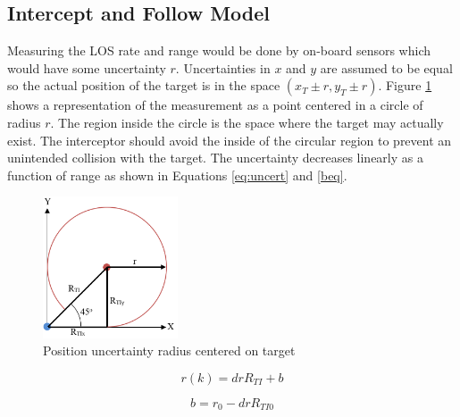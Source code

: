\documentclass[conference]{IEEEtran}
\begin{document}
%		


\subsection{Intercept and Follow Model}
Measuring the LOS rate and range would be done by on-board sensors which would have some uncertainty $r$. Uncertainties in $x$ and $y$ are assumed to be equal so the actual position of the target is in the space $(x_T\pm r,y_T \pm r)$. Figure \ref{fig:uncertrad} shows a representation of the measurement as a point centered in a circle of radius $r$. The region inside the circle is the space where the target may actually exist. The interceptor should avoid the inside of the circular region to prevent an unintended collision with the target. The uncertainty decreases linearly as a function of range as shown in Equations \ref{eq:uncert} and \ref{beq}.

\begin{figure}[H]
	\centering
	\includegraphics[width=4cm]{45deguncert.PNG}
	\caption{Position uncertainty radius centered on target}
	\label{fig:uncertrad}
\end{figure}


\begin{equation} \label{eq:uncert}
r(k) = drR_{TI}+b
\end{equation}

\begin{equation} \label{beq}
b = r_0-drR_{TI0}
\end{equation}
\end{document}
